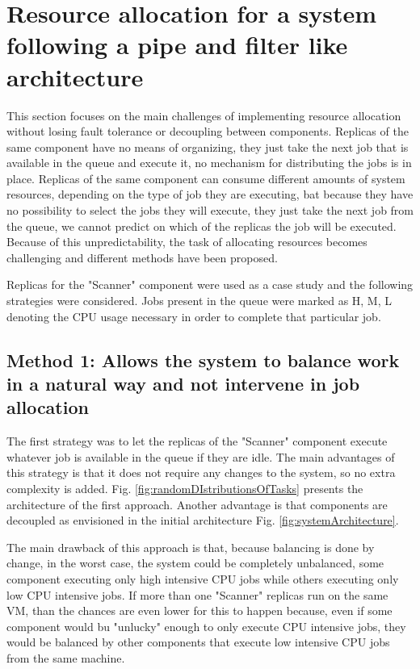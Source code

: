 \section{Resource allocation for a system following a pipe and filter like architecture}
This section focuses on the main challenges of implementing resource allocation without losing fault tolerance or decoupling between components. Replicas of the same component have no means of organizing, they just take the next job that is available in the queue and execute it, no mechanism for distributing the jobs is in place. Replicas of the same component can consume different amounts of system resources, depending on the type of job they are executing, bat because they have no possibility to select the jobs they will execute, they just take the next job from the queue, we cannot predict on which of the replicas the job will be executed. Because of this unpredictability, the task of allocating resources becomes challenging and different methods have been proposed.

Replicas for the "Scanner" component were used as a case study and the following strategies were considered. Jobs present in the queue were marked as H, M, L denoting the CPU usage necessary in order to complete that particular job.


\subsection{Method 1: Allows the system to balance work in a natural way and not intervene in job allocation}
The first strategy was to let the replicas of the "Scanner" component execute whatever job is available in the queue if they are idle. The main advantages of this strategy is that it does not require any changes to the system, so no extra complexity is added. Fig. \ref{fig:randomDIstributionsOfTasks} presents the architecture of the first approach. Another advantage is that components are decoupled as envisioned in the initial architecture Fig. \ref{fig:systemArchitecture}.

The main drawback of this approach is that, because balancing is done by change, in the worst case, the system could be completely unbalanced, some component executing only high intensive CPU jobs while others executing only low CPU intensive jobs. If more than one "Scanner" replicas run on the same VM, than the chances are even lower for this to happen because, even if some component would bu "unlucky" enough to only execute CPU intensive jobs, they would be balanced by other components that execute low intensive CPU jobs from the same machine.

